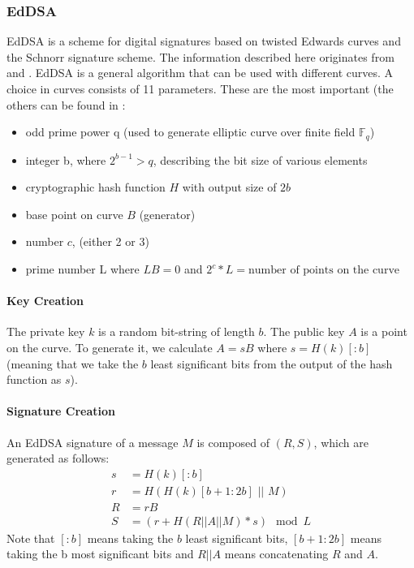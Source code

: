 \subsubsection{\acl{EdDSA}}
\ac{EdDSA} is a scheme for digital signatures based on twisted Edwards curves and the Schnorr signature scheme.
The information described here originates from \cite{rfc8032} and \cite{enwiki:1013094030}.
\ac{EdDSA} is a general algorithm that can be used with different curves. A choice in curves consists of 11 parameters. These are the most important (the others can be found in \cite{rfc8032}:
\begin{itemize}
    \item odd prime power q (used to generate elliptic curve over finite field $ \mathbb{F}_q $)
    \item integer b, where $ 2^{b-1} > q $, describing the bit size of various elements
    \item cryptographic hash function $ H $ with output size of $ 2b $
    \item base point on curve $ B $ (generator)
    \item number $ c $, (either 2 or 3)
    \item prime number L where $ LB = 0 $ and $2^c*L = \text{number of points on the curve} $
\end{itemize}

\paragraph{Key Creation}
\label{sec:eddsa-keygen}
The private key $ k $ is a random bit-string of length $ b $.
The public key $ A $ is a point on the curve.
To generate it, we calculate $ A = sB $ where $ s = H(k)[:b] $ (meaning that we take the $ b $ least significant bits from the output of the hash function as $ s $).

\paragraph{Signature Creation}
\label{sec:eddsa-signature-creation}
An \ac{EdDSA} signature of a message $ M $ is composed of $ (R, S )$, which are generated as follows:
\begin{align*}
    s & = H(k)[:b]
    \\r &= H(H(k)[b + 1:2b] \text{ || } M )
    \\R &= rB
    \\S &= (r + H(R || A || M) * s) \mod L
\end{align*}
Note that $ [:b] $ means taking the $ b $ least significant bits, $ [b + 1:2b] $ means taking the b most significant bits and $ R || A $ means concatenating $ R $ and $ A $.

